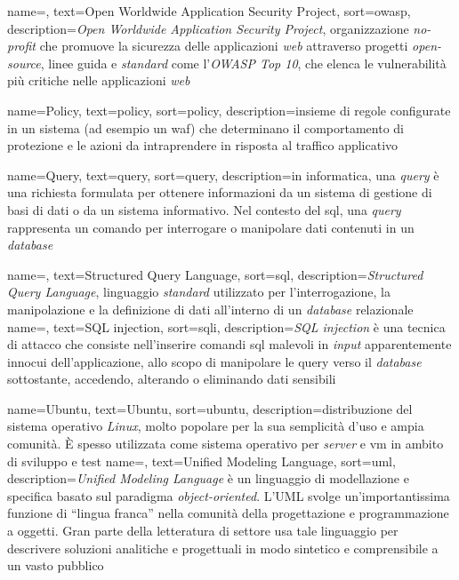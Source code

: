 

 {
    name=,
    text=Open Worldwide Application Security Project,
    sort=owasp,
    description={\emph{Open Worldwide Application Security Project}, organizzazione \emph{no-profit} che promuove la sicurezza delle applicazioni \emph{web} attraverso progetti \emph{open-source}, linee guida e \emph{standard} come l'\emph{OWASP Top 10}, che elenca le vulnerabilità più critiche nelle applicazioni \emph{web}}
}

 {
    name=Policy,
    text=policy,
    sort=policy,
    description={insieme di regole configurate in un sistema (ad esempio un \gls{waf}) che determinano il comportamento di protezione e le azioni da intraprendere in risposta al traffico applicativo}
}

 {
    name=Query,
    text=query,
    sort=query,
    description={in informatica, una \emph{query} è una richiesta formulata per ottenere informazioni da un sistema di gestione di basi di dati o da un sistema informativo. Nel contesto del \gls{sql}, una \emph{query} rappresenta un comando per interrogare o manipolare dati contenuti in un \emph{database}}
}


 {
    name=,
    text=Structured Query Language,
    sort=sql,
    description={\emph{Structured Query Language}, linguaggio \emph{standard} utilizzato per l'interrogazione, la manipolazione e la definizione di dati all'interno di un \emph{database} relazionale}
}
 {
    name=,
    text=SQL injection,
    sort=sqli,
    description={\emph{SQL injection} è una tecnica di attacco che consiste nell'inserire comandi \gls{sql} malevoli in \emph{input} apparentemente innocui dell'applicazione, allo scopo di manipolare le \gls{query} verso il \emph{database} sottostante, accedendo, alterando o eliminando dati sensibili}
}


 {
    name=Ubuntu,
    text=Ubuntu,
    sort=ubuntu,
    description={distribuzione del sistema operativo \emph{Linux}, molto popolare per la sua semplicità d'uso e ampia comunità. È spesso utilizzata come sistema operativo per \emph{server} e \gls{vm} in ambito di sviluppo e test}
}
 {
    name=,
    text=Unified Modeling Language,
    sort=uml,
    description={\emph{Unified Modeling Language} è un linguaggio di modellazione e specifica basato sul paradigma \emph{object-oriented}. L'\gls{UML} svolge un'importantissima funzione di ``lingua franca'' nella comunità della progettazione e programmazione a oggetti. Gran parte della letteratura di settore usa tale linguaggio per descrivere soluzioni analitiche e progettuali in modo sintetico e comprensibile a un vasto pubblico}
}


